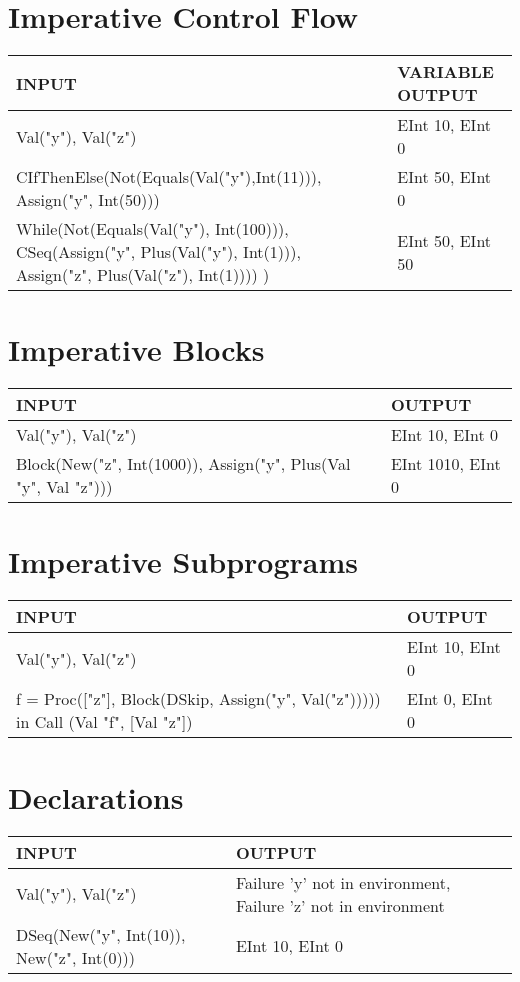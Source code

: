 \documentclass[11pt]{report}
\begin{document}
\chapter{Imperative Control Flow}
\label{sec:org440da52}
\begin{center}
\begin{tabularx}{\textwidth}{Xl}
INPUT & VARIABLE OUTPUT\\
\hline
Val("y"), Val("z") & EInt 10, EInt 0\\
CIfThenElse(Not(Equals(Val("y"),Int(11))), Assign("y", Int(50))) & EInt 50, EInt 0\\
While(Not(Equals(Val("y"), Int(100))), CSeq(Assign("y", Plus(Val("y"), Int(1))), Assign("z", Plus(Val("z"), Int(1)))) ) & EInt 50, EInt 50\\
\end{tabularx}
\end{center}
\chapter{Imperative Blocks}
\label{sec:org18eb8eb}
\begin{center}
\begin{tabularx}{\textwidth}{Xl}
INPUT & OUTPUT\\
\hline
Val("y"), Val("z") & EInt 10, EInt 0\\
Block(New("z", Int(1000)), Assign("y", Plus(Val "y", Val "z"))) & EInt 1010, EInt 0\\
\end{tabularx}
\end{center}
\chapter{Imperative Subprograms}
\label{sec:org95a324e}
\begin{center}
\begin{tabularx}{\textwidth}{Xl}
INPUT & OUTPUT\\
\hline
Val("y"), Val("z") & EInt 10, EInt 0\\
f = Proc(["z"], Block(DSkip, Assign("y", Val("z"))))) in Call (Val "f", [Val "z"]) & EInt 0, EInt 0\\
\end{tabularx}
\end{center}
\chapter{Declarations}
\label{sec:org93c14ff}
\begin{center}
\begin{tabularx}{\textwidth}{lX}
INPUT & OUTPUT\\
\hline
Val("y"), Val("z") & Failure 'y' not in environment, Failure 'z' not in environment\\
DSeq(New("y", Int(10)), New("z", Int(0))) & EInt 10, EInt 0\\
\end{tabularx}
\end{center}
\end{document}
